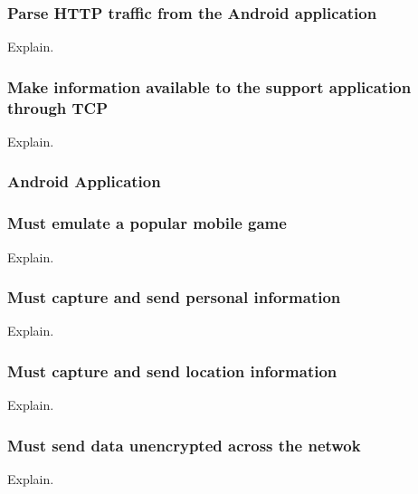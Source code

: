 \subsubsection*{Parse HTTP traffic from the Android application}
Explain.

\subsubsection*{Make information available to the support application through TCP}
Explain.

\subsubsection{Android Application}
\subsubsection*{Must emulate a popular mobile game}
Explain.
\subsubsection*{Must capture and send personal information}
Explain.
\subsubsection*{Must capture and send location information}
Explain.
\subsubsection*{Must send data unencrypted across the netwok}
Explain.
\clearpage